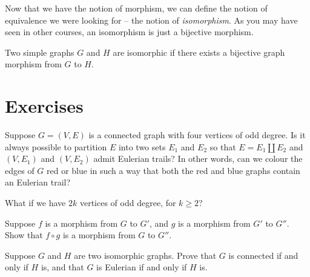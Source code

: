 \documentclass[nobib]{tufte-handout}
\begin{document}
Now that we have the notion of morphism, we can define the notion of equivalence we were looking for -- the notion of \emph{isomorphism}. As you may have seen in other courses, an isomorphism is just a bijective morphism.

\begin{definition}
  Two simple graphs $G$ and $H$ are isomorphic if there exists a bijective graph morphism from $G$ to $H$.
\end{definition}

\section{Exercises}

\begin{xca}
  Suppose $G = (V, E)$ is a connected graph with four vertices of odd degree. Is it always possible to partition $E$ into two sets $E_1$ and $E_2$ so that $E = E_1 \coprod E_2$ and $(V, E_1)$ and $(V,E_2)$ admit Eulerian trails? In other words, can we colour the edges of $G$ red or blue in such a way that both the red and blue graphs contain an Eulerian trail?

  What if we have $2k$ vertices of odd degree, for $k \geq 2$?
\end{xca}

\begin{xca}
  Suppose $f$ is a morphism from $G$ to $G'$, and $g$ is a morphism from $G'$ to $G''$. Show that $f \circ g$ is a morphism from $G$ to $G''$.
\end{xca}

\begin{xca}
  Suppose $G$ and $H$ are two isomorphic graphs. Prove that $G$ is connected if and only if $H$ is, and that $G$ is Eulerian if and only if $H$ is.
\end{xca}

%
%
\end{document}
